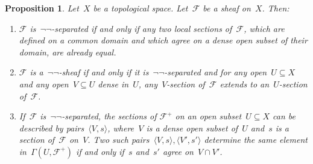 \documentclass[10pt,reqno,a4paper]{amsbook}
\theoremstyle{definition}
\theoremstyle{plain}
\newtheorem{prop}[defn]{Proposition}
\theoremstyle{remark}
\newcommand{\F}{\mathcal{F}}
\newcommand{\?}{\,{:}\,}
\renewcommand{\_}{\mathpunct{.}\,}
\begin{document}
\begin{prop}\label{prop:negneg-sheaves}
Let~$X$ be a topological space. Let~$\F$ be a sheaf on~$X$. Then:
\begin{enumerate}
\item $\F$ is~$\neg\neg$-separated if and only if any two local sections
of~$\F$, which are defined on a common domain and which agree on a dense open
subset of their domain, are already equal.
\item $\F$ is a~$\neg\neg$-sheaf if and only if it is~$\neg\neg$-separated and
for any open~$U \subseteq X$ and any open~$V \subseteq U$ dense
in~$U$, any~$V$-section of~$\F$ extends to an~$U$-section of~$\F$.
\item If~$\F$ is~$\neg\neg$-separated, the sections of $\F^+$ on an open
subset~$U \subseteq X$ can be described by pairs~$\langle V,s \rangle$, where~$V$ is a dense
open subset of~$U$ and~$s$ is a section of~$\F$ on~$V$. Two such pairs~$\langle V,s \rangle,
\langle V',s' \rangle$ determine the same element in~$\Gamma(U,\F^+)$ if and only if~$s$ and~$s'$
agree on~$V \cap V'$.
\end{enumerate}
\end{prop}
\end{document}
